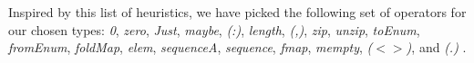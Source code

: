 \documentclass{article}
\begin{document}
Inspired by this list of heuristics,
we have picked the following set of operators for our chosen types:
\emph{0}, %
\emph{zero}, %
\emph{Just}, %
\emph{maybe}, %
\emph{(:)}, %
\emph{length}, %
\emph{(,)}, %
\emph{zip}, %
\emph{unzip}, %
\emph{toEnum}, %
\emph{fromEnum}, %
\emph{foldMap}, %
\emph{elem}, %
\emph{sequenceA}, %
\emph{sequence}, %
\emph{fmap}, %
\emph{mempty}, %
\emph{($<>$)}, %
and \emph{(.)}%
. %
\end{document}
